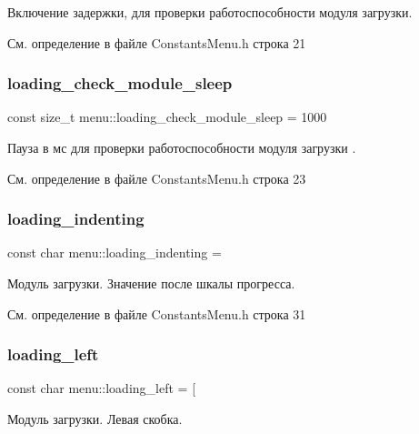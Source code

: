 Включение задержки, для проверки работоспособности модуля загрузки. 

См. определение в файле Constants\+Menu.\+h строка 21

\mbox{\label{namespacemenu_a69bce854c4a150920a5c77eede8cab0a}} 
\subsubsection{\texorpdfstring{loading\+\_\+check\+\_\+module\+\_\+sleep}{loading\_check\_module\_sleep}}
{\footnotesize\ttfamily const size\+\_\+t menu\+::loading\+\_\+check\+\_\+module\+\_\+sleep = 1000}

Пауза в мс для проверки работоспособности модуля загрузки . 

См. определение в файле Constants\+Menu.\+h строка 23

\mbox{\label{namespacemenu_ad004c327a8a1c14388a6c7f23d6953a6}} 
\subsubsection{\texorpdfstring{loading\+\_\+indenting}{loading\_indenting}}
{\footnotesize\ttfamily const char menu\+::loading\+\_\+indenting = \textquotesingle{} \textquotesingle{}}

Модуль загрузки. Значение после шкалы прогресса. 

См. определение в файле Constants\+Menu.\+h строка 31

\mbox{\label{namespacemenu_a56af6a2d586e2b6baa4ebf128a690266}} 
\subsubsection{\texorpdfstring{loading\+\_\+left}{loading\_left}}
{\footnotesize\ttfamily const char menu\+::loading\+\_\+left = \textquotesingle{}\mbox{[}\textquotesingle{}}

Модуль загрузки. Левая скобка. 

